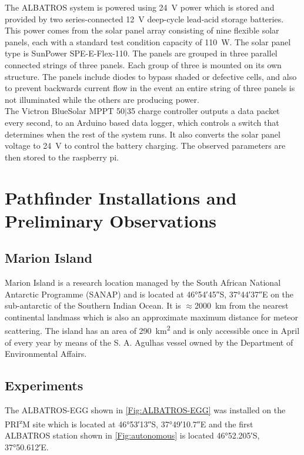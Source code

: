 \documentclass{ws-jai}
\begin{document}
The ALBATROS system is powered using \SI{24}{\volt} power which is stored and provided by two series-connected \SI{12}{\volt} deep-cycle lead-acid storage batteries. This power comes from the solar panel array consisting of nine flexible solar panels, each with a standard test condition capacity of \SI{110}{\watt}. The solar panel type is SunPower SPE-E-Flex-110. The panels are grouped in three parallel connected strings of three panels. Each group of three is mounted on its own structure. The panels include diodes to bypass shaded or defective cells, and also to prevent backwards current flow in the event an entire string of three panels is not illuminated while the others are producing power. \\

The Victron BlueSolar MPPT 50$\vert$35 charge controller outputs a data packet every second, to an Arduino based data logger, which controls a switch that determines when the rest of the system runs. It also converts the solar panel voltage to \SI{24}{\volt} to control the battery charging. The observed parameters are then stored to the raspberry pi.

\section{Pathfinder Installations and Preliminary Observations}
\subsection{Marion Island}
 Marion Island is a research location managed by the South African National Antarctic Programme (SANAP) and is located at \ang{46;54;45}S, \ang{37;44;37}E on the sub-antarctic of the Southern Indian Ocean. It is $\approx$\SI{2000}{\kilo\metre} from the nearest continental landmass which is also an approximate maximum distance for meteor scattering. The island has an area of \SI{290}{\kilo\metre\squared} and is only accessible once in April of every year by means of the S. A. Agulhas vessel owned by the Department of Environmental Affairs.  
 
 \subsection{Experiments}
 The ALBATROS-EGG shown in \autoref{Fig:ALBATROS-EGG} was installed on the PRI\textsuperscript{z}M \cite{2019JAI.....850004P} site which is located at \ang{46;53;13}S, \ang{37;49;10.7}E and the first ALBATROS station shown in \autoref{Fig:autonomous} is located \ang{46;52.205;}S, \ang{37;50.612;}E.\\
 
\end{document}
